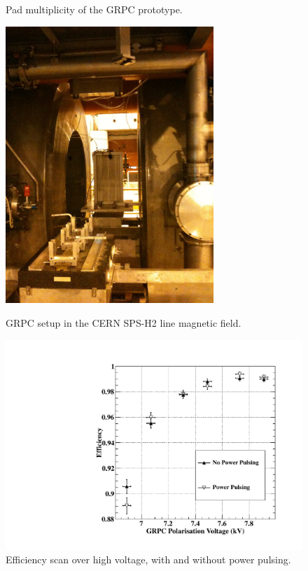 \begin{figure}
\begin{minipage}[t]{0.49\textwidth}
 \caption{Pad multiplicity of the GRPC prototype. }
 \label{fig:Calorimeter:SDHCAL_GRPC:Mult}
 \end{minipage}
 \end{figure}

\begin{figure}
    \centering
 \begin{minipage}[t]{0.45\textwidth}
 \includegraphics*[width=0.7\textwidth,keepaspectratio]{Calorimeter/SDHCAL_GRPC/figures/BeamLine.jpg}
	\caption{GRPC setup in the CERN SPS-H2 line magnetic field.}
 \label{fig:Calorimeter:SDHCAL_GRPC:PP1}
 \end{minipage}
 \hfill
 \begin{minipage}[t]{0.45\textwidth}
 \includegraphics*[width=\textwidth,keepaspectratio]{Calorimeter/SDHCAL_GRPC/figures/BField_Efficiency_PowerPulsed.pdf}
 \caption{Efficiency scan over high voltage, with and without power pulsing. }
 \label{fig:Calorimeter:SDHCAL_GRPC:PP2}
 \end{minipage}
 \end{figure}


